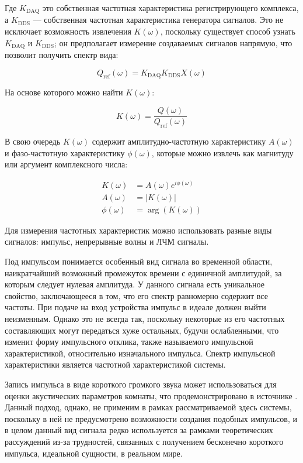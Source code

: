 \documentclass{report}
\begin{document}
Где $K_\text{DAQ}$ это собственная частотная характеристика регистрирующего комплекса, а $K_\text{DDS}$ --- собственная частотная характеристика генератора сигналов. Это не исключает возможность извлечения $K(\omega)$, поскольку существует способ узнать $K_\text{DAQ}$ и $K_\text{DDS}$; он предполагает измерение создаваемых сигналов напрямую, что позволит получить спектр вида:

\begin{equation}
Q_\text{ref}(\omega) = K_\text{DAQ} K_\text{DDS} X(\omega)
\end{equation}

На основе которого можно найти $K(\omega)$:

\begin{equation}
K(\omega) = \frac{Q(\omega)}{Q_\text{ref}(\omega)}
\end{equation}

В свою очередь $K(\omega)$ содержит амплитудно-частотную характеристику $A(\omega)$ и фазо-частотную характеристику $\phi(\omega)$, которые можно извлечь как магнитуду или аргумент комплексного числа:

\begin{align}
K(\omega) &= A(\omega) e^{i \phi(\omega) } \\
A(\omega) &= \left|K(\omega)\right| \\
\phi(\omega) &= \arg\left(K\left(\omega\right)\right)
\end{align}

Для измерения частотных характеристик можно использовать разные виды сигналов: импульс, непрерывные волны и ЛЧМ сигналы.

Под импульсом понимается особенный вид сигнала во временной области, наикратчайший возможный промежуток времени с единичной амплитудой, за которым следует нулевая амплитуда. У данного сигнала есть уникальное свойство, заключающееся в том, что его спектр равномерно содержит все частоты. При подаче на вход устройства импульс в идеале должен выйти неизменным. Однако это не всегда так, поскольку некоторые из его частотных составляющих могут передаться хуже остальных, будучи ослабленными, что изменит форму импульсного отклика, также называемого импульсной характеристикой, относительно изначального импульса. Спектр импульсной характеристики является частотной характеристикой системы.

Запись импульса в виде короткого громкого звука может использоваться для оценки акустических параметров комнаты, что продемонстрировано в источнике \cite{thinkdsp}. Данный подход, однако, не применим в рамках рассматриваемой здесь системы, поскольку в ней не предусмотрено возможности создания подобных импульсов, и в целом данный вид сигнала редко используется за рамками теоретических рассуждений из-за трудностей, связанных с получением бесконечно короткого импульса, идеальной сущности, в реальном мире.
\end{document}
